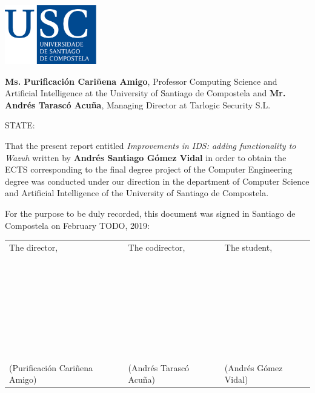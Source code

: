 \pagestyle{plain}
\includegraphics[width=4cm]{figuras/logo_usc.eps}

\vspace{1cm}
{\bf Ms. Purificación Cariñena Amigo}, Professor Computing Science and Artificial Intelligence at the University of Santiago de Compostela and {\bf Mr. Andrés Tarascó Acuña}, Managing Director at Tarlogic Security S.L.

\vspace{1cm}
STATE:

\vspace{1cm}
That the present report entitled \textit{Improvements in IDS: adding functionality to Wazuh} written by \textbf{Andrés Santiago Gómez Vidal} in order to obtain the ECTS corresponding to the final degree project of the Computer Engineering degree was conducted under our direction in the department of Computer Science and Artificial Intelligence of the University of Santiago de Compostela.

\vspace{1cm}
For the purpose to be duly recorded, this document was signed in Santiago de Compostela on February TODO, 2019:

\vspace{2cm}
\begin{tabular}{lll}
The director, & The codirector, & The student, \\
~ \\
~ \\
~ \\
~ \\
~ \\
~ \\
~ \\
(Purificación Cariñena Amigo) & (Andrés Tarascó Acuña) & (Andrés Gómez Vidal)
\end{tabular}

